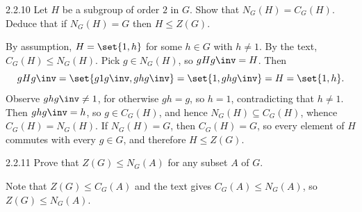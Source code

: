 \begin{exercise}{2.2.10}
    Let $H$ be a subgroup of order $2$ in $G$.
	Show that $N_G(H) = C_G(H)$.
	Deduce that if $N_G(H) = G$ then $H \leq Z(G)$.
\end{exercise}

\begin{sol}
    By assumption, $H = \set{1, h}$ for some $h \in G$ with $h \neq 1$.
	By the text, $C_G(H) \leq N_G(H)$.
    Pick $g \in N_G(H)$, so $gHg\inv = H$.
    Then
    \[
        gHg\inv = \set{g1g\inv, ghg\inv} = \set{1, ghg\inv} = H = \set{1, h}.
    \]
    Observe $ghg\inv \neq 1$, for otherwise $gh = g$, so $h = 1$, contradicting that $h \neq 1$.
    Then $ghg\inv = h$, so $g \in C_G(H)$, and hence $N_G(H) \subseteq C_G(H)$, whence $C_G(H) = N_G(H)$.
    If $N_G(H) = G$, then $C_G(H) = G$, so every element of $H$ commutes with every $g \in G$, and therefore $H \leq Z(G)$.
\end{sol}

\begin{exercise}{2.2.11}
    Prove that $Z(G) \leq N_G(A)$ for any subset $A$ of $G$.
\end{exercise}

\begin{sol}
    Note that $Z(G) \leq C_G(A)$ and the text gives $C_G(A) \leq N_G(A)$, so $Z(G) \leq N_G(A)$.
\end{sol}

